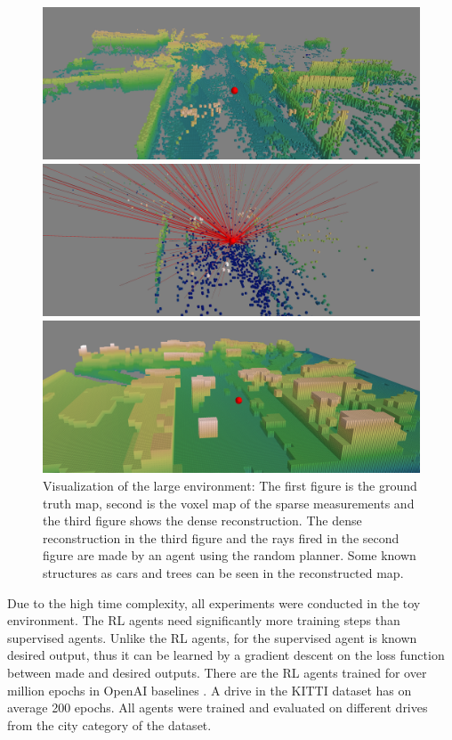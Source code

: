 \begin{figure}[h!]
\centering
\includegraphics[width=0.8\linewidth]{fig/gt.png}

\vspace{1mm}

\includegraphics[width=0.8\linewidth]{fig/sparse.png}

\vspace{1mm}

\includegraphics[width=0.8\linewidth]{fig/reconstructed.png}

\caption[Environment visualization]{Visualization of the large environment: The first figure is the ground truth map, second is the voxel map of the sparse measurements and the third figure shows the dense reconstruction. The dense reconstruction in the third figure and the rays fired in the second figure are made by an agent using the random planner. Some known structures as cars and trees can be seen in the reconstructed map.}
\label{fig:visualization}
\end{figure}

\clearpage
Due to the high time complexity, all experiments were conducted in the toy environment. The RL agents need significantly more training steps than supervised agents. Unlike the RL agents, for the supervised agent is known desired output, thus it can be learned by a gradient descent on the loss function between made and desired outputs. There are the RL agents trained for over million epochs in OpenAI baselines \cite{openai2017}. A drive in the KITTI dataset has on average 200 epochs. All agents were trained and evaluated on different drives from the city category of the dataset.

